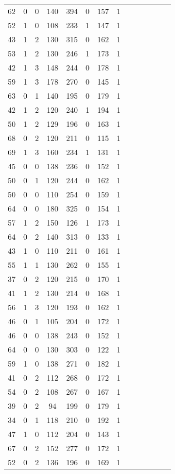 \documentclass{article}
\begin{document}
\begin{longtable}{|c|c|c|c|c|c|c|c|c|c|c|c|c|c|}
62 & 0 & 0 & 140 & 394 & 0 & 157 & 1\\
52 & 1 & 0 & 108 & 233 & 1 & 147 & 1\\
43 & 1 & 2 & 130 & 315 & 0 & 162 & 1\\
53 & 1 & 2 & 130 & 246 & 1 & 173 & 1\\
42 & 1 & 3 & 148 & 244 & 0 & 178 & 1\\
59 & 1 & 3 & 178 & 270 & 0 & 145 & 1\\
63 & 0 & 1 & 140 & 195 & 0 & 179 & 1\\
42 & 1 & 2 & 120 & 240 & 1 & 194 & 1\\
50 & 1 & 2 & 129 & 196 & 0 & 163 & 1\\
68 & 0 & 2 & 120 & 211 & 0 & 115 & 1\\
69 & 1 & 3 & 160 & 234 & 1 & 131 & 1\\
45 & 0 & 0 & 138 & 236 & 0 & 152 & 1\\
50 & 0 & 1 & 120 & 244 & 0 & 162 & 1\\
50 & 0 & 0 & 110 & 254 & 0 & 159 & 1\\
64 & 0 & 0 & 180 & 325 & 0 & 154 & 1\\
57 & 1 & 2 & 150 & 126 & 1 & 173 & 1\\
64 & 0 & 2 & 140 & 313 & 0 & 133 & 1\\
43 & 1 & 0 & 110 & 211 & 0 & 161 & 1\\
55 & 1 & 1 & 130 & 262 & 0 & 155 & 1\\
37 & 0 & 2 & 120 & 215 & 0 & 170 & 1\\
41 & 1 & 2 & 130 & 214 & 0 & 168 & 1\\
56 & 1 & 3 & 120 & 193 & 0 & 162 & 1\\
46 & 0 & 1 & 105 & 204 & 0 & 172 & 1\\
46 & 0 & 0 & 138 & 243 & 0 & 152 & 1\\
64 & 0 & 0 & 130 & 303 & 0 & 122 & 1\\
59 & 1 & 0 & 138 & 271 & 0 & 182 & 1\\
41 & 0 & 2 & 112 & 268 & 0 & 172 & 1\\
54 & 0 & 2 & 108 & 267 & 0 & 167 & 1\\
39 & 0 & 2 & 94 & 199 & 0 & 179 & 1\\
34 & 0 & 1 & 118 & 210 & 0 & 192 & 1\\
47 & 1 & 0 & 112 & 204 & 0 & 143 & 1\\
67 & 0 & 2 & 152 & 277 & 0 & 172 & 1\\
52 & 0 & 2 & 136 & 196 & 0 & 169 & 1\\

\end{longtable}
\end{document}
